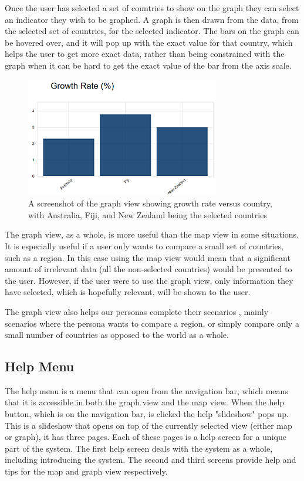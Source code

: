 \documentclass[10pt, journal]{IEEEtran}
\begin{document}
Once the user has selected a set of countries to show on the graph they can select an indicator they wish to be graphed. A graph is then drawn from the data, from the selected set of countries, for the selected indicator. The bars on the graph can be hovered over, and it will pop up with the exact value for that country, which helps the user to get more exact data, rather than being constrained with the graph when it can be hard to get the exact value of the bar from the axis scale.


\begin{figure}[h]
\includegraphics{graph.png}
\caption{A screenshot of the graph view showing growth rate versus country, with Australia, Fiji, and New Zealand being the selected countries}
\end{figure}


The graph view, as a whole, is more useful than the map view in some situations. It is especially useful if a user only wants to compare a small set of countries, such as a region. In this case using the map view would mean that a significant amount of irrelevant data (all the non-selected countries) would be presented to the user. However, if the user were to use the graph view, only information they have selected, which is hopefully relevant, will be shown to the user.

The graph view also helps our personas \cite{personas} complete their scenarios \cite{scenarios}, mainly scenarios where the persona wants to compare a region, or simply compare only a small number of countries as opposed to the world as a whole.

\subsection{Help Menu}

The help menu is a menu that can open from the navigation bar, which means that it is accessible in both the graph view and the map view. When the help button, which is on the navigation bar, is clicked the help "slideshow" pops up. This is a slideshow that opens on top of the currently selected view (either map or graph), it has three pages. Each of these pages is a help screen for a unique part of the system. The first help screen deals with the system as a whole, including introducing the system. The second and third screens provide help and tips for the map and graph view respectively.
\end{document}
